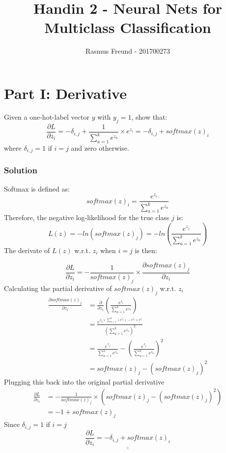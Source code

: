 \documentclass[english,11pt,a4paper,titlepage]{report}
\title{Handin 2 - Neural Nets for Multiclass Classification}
\author{Rasmus Freund - 201700273}
\begin{document}
	\maketitle
	
	\section*{Part I: Derivative}
	Given a one-hot-label vector $y$ with $y_j = 1$, show that:
	\begin{equation*}
	\frac{\partial L}{\partial z_i} = - \delta_{i,j} + \frac{1}{\sum_{a=1}^{k} e^{z_a}} \times e^{z_i} = -\delta_{i,j} + softmax(z)_i
	\end{equation*}
	where $\delta_{i,j} = 1$ if $i=j$ and zero otherwise.
	
	\subsubsection{Solution}
	Softmax is defined as:
	\begin{equation*}
	softmax(z)_i = \frac{e^{z_i}}{\sum_{a=1}^{k} e^{z_a}}
	\end{equation*}
	Therefore, the negative log-likelihood for the true class $j$ is:
	\begin{equation*}
	L(z) = -ln(softmax(z)_j) = -ln \left( \frac{e^{z_j}}{\sum_{a=1}^{k} e^{z_a}} \right)
	\end{equation*}
	The derivate of $L(z)$ w.r.t. $z_i$ when $i=j$ is then:
	
	\begin{equation*}
	\frac{\partial L}{\partial z_i} = -\frac{1}{softmax(z)_j} \times \frac{\partial softmax(z)_j}{\partial z_i}
	\end{equation*}
	Calculating the partial derivative of $softmax(z)_j$ w.r.t. $z_i$
	\begin{align*}
	\frac{\partial softmax(z)_j}{\partial z_i} &= \frac{\partial}{\partial z_i} \left( \frac{e^{z_i}}{\sum_{a=1}^{k} e^{z_a}} \right) \\[7pt]
											   &= \frac{e^{z_j \times \sum_{a=1}^{k} (e^{z_a})-e^{z_j} \times e^{z_i}}}{(\sum_{a=1}^{k} e^{z_a})^2} \\[7pt]
											   &= \frac{e^{z_j}}{\sum_{a=1}^{k} e^{z_a}} - \left( \frac{e^{z_j}}{\sum_{a=1}^{k} e^{z_a}} \right)^2 \\[7pt]
											   &= softmax(z)_j - (softmax(z)_j)^2
	\end{align*}
	Plugging this back into the original partial derivative
	\begin{align*}
	\frac{\partial L}{\partial z_i} &= -\frac{1}{softmax(z)_j} \times (softmax(z)_j - (softmax(z)_j)^2) \\
									&= -1 + softmax(z)_j
	\end{align*}
	Since $\delta_{i,j}=1$ if $i=j$
	\begin{equation*}
	\underline{\underline{\frac{\partial L}{\partial z_i} = -\delta_{i,j} + softmax(z)_i}}
	\end{equation*}
	
\end{document}
